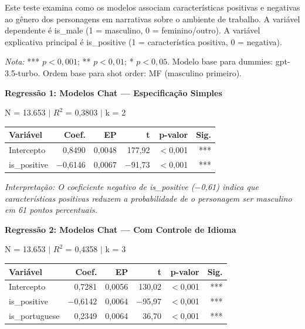 \documentclass[12pt,a4paper]{article}
\begin{document}
Este teste examina como os modelos associam características positivas e
negativas ao gênero dos personagens em narrativas sobre o ambiente de
trabalho. A variável dependente é is\_male (1 = masculino, 0 =
feminino/outro). A variável explicativa principal é is\_positive (1 =
característica positiva, 0 = negativa).

\textit{Nota:} *** $p < 0,001$; ** $p < 0,01$; * $p < 0,05$. Modelo base para
dummies: gpt-3.5-turbo. Ordem base para shot order: MF (masculino
primeiro).

\vspace{0.5cm}
\noindent\textbf{Regressão 1: Modelos Chat --- Especificação Simples}

\noindent N = 13.653 $|$ $R^2$ = 0,3803 $|$ k = 2

\begin{table}[H]
\centering
\begin{tabular}{lrrrrr}
\toprule
\textbf{Variável} & \textbf{Coef.} & \textbf{EP} & \textbf{t} & \textbf{p-valor} & \textbf{Sig.} \\
\midrule
Intercepto & 0,8490 & 0,0048 & 177,92 & $<$0,001 & *** \\
is\_positive & $-$0,6146 & 0,0067 & $-$91,73 & $<$0,001 & *** \\
\bottomrule
\end{tabular}
\end{table}

\noindent\textit{Interpretação: O coeficiente negativo de is\_positive ($-$0,61) indica que
características positivas reduzem a probabilidade de o personagem ser
masculino em 61 pontos percentuais.}

\vspace{0.5cm}
\noindent\textbf{Regressão 2: Modelos Chat --- Com Controle de Idioma}

\noindent N = 13.653 $|$ $R^2$ = 0,4358 $|$ k = 3

\begin{table}[H]
\centering
\begin{tabular}{lrrrrr}
\toprule
\textbf{Variável} & \textbf{Coef.} & \textbf{EP} & \textbf{t} & \textbf{p-valor} & \textbf{Sig.} \\
\midrule
Intercepto & 0,7281 & 0,0056 & 130,02 & $<$0,001 & *** \\
is\_positive & $-$0,6142 & 0,0064 & $-$95,97 & $<$0,001 & *** \\
is\_portuguese & 0,2349 & 0,0064 & 36,70 & $<$0,001 & *** \\
\bottomrule
\end{tabular}
\end{table}
\end{document}

